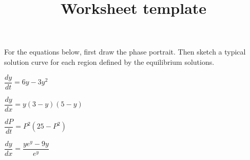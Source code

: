 \documentclass[12pt]{exam}
\title{Worksheet template}
\begin{document}
\bigskip
\bigskip

For the equations below, first draw the phase portrait.  Then sketch a typical solution curve for each region defined by the equilibrium solutions.

\begin{questions}

\question
$\dfrac{dy}{dt} = 6y - 3y^2$

\question
$\dfrac{dy}{dx} = y(3 - y)(5 - y)$

\question
$\dfrac{dP}{dt} = P^2 (25 - P^2)$

\question
$\dfrac{dy}{dx} = \dfrac{ye^y - 9y}{e^y}$


\end{questions}
\end{document}
